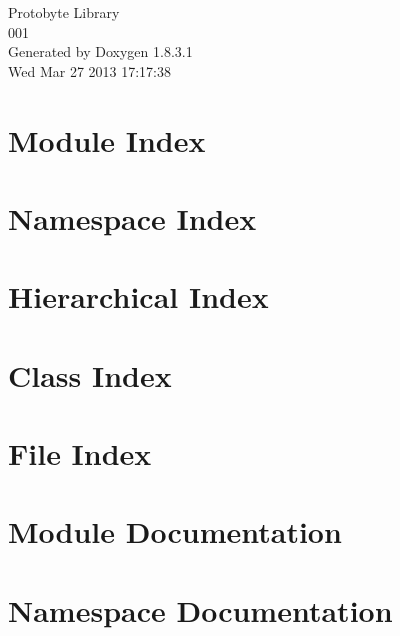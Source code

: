 \documentclass{book}
\begin{document}
\hypersetup{pageanchor=false,citecolor=blue}
\begin{titlepage}
\vspace*{7cm}
\begin{center}
{\Large Protobyte Library \\[1ex]\large 001 }\\
\vspace*{1cm}
{\large Generated by Doxygen 1.8.3.1}\\
\vspace*{0.5cm}
{\small Wed Mar 27 2013 17:17:38}\\
\end{center}
\end{titlepage}
\clearemptydoublepage
{}
\tableofcontents
\clearemptydoublepage
{}
\hypersetup{pageanchor=true,citecolor=blue}
\chapter{Module Index}

\chapter{Namespace Index}

\chapter{Hierarchical Index}

\chapter{Class Index}

\chapter{File Index}

\chapter{Module Documentation}





\chapter{Namespace Documentation}






\end{document}
